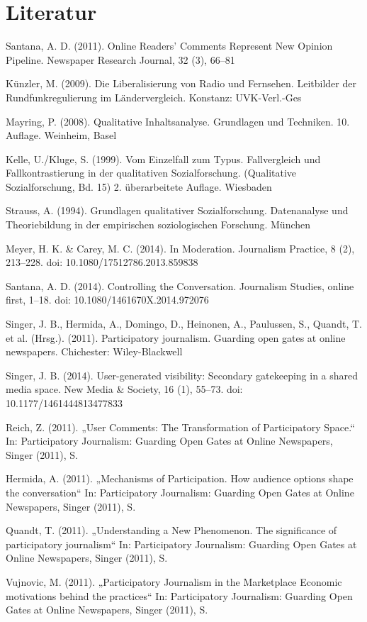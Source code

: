 \documentclass[12pt,titlepage=no,parskip=full]{scrartcl} %
\begin{document}
\section{Literatur}

Santana, A. D. (2011). Online Readers' Comments Represent New Opinion Pipeline. Newspaper Research Journal, 32 (3), 66–81

Künzler, M. (2009). Die Liberalisierung von Radio und Fernsehen. Leitbilder der Rundfunkregulierung im Ländervergleich. Konstanz: UVK-Verl.-Ges

Mayring, P. (2008). Qualitative Inhaltsanalyse. Grundlagen und Techniken. 10. Auflage. Weinheim, Basel

Kelle, U./Kluge, S. (1999). Vom Einzelfall zum Typus. Fallvergleich und Fallkontrastierung in der qualitativen Sozialforschung. 
(Qualitative Sozialforschung, Bd. 15) 2. überarbeitete Auflage. Wiesbaden

Strauss, A. (1994). Grundlagen qualitativer Sozialforschung. Datenanalyse und Theoriebildung in der empirischen
soziologischen Forschung. München

Meyer, H. K. \&  Carey, M. C. (2014). In Moderation. Journalism Practice, 8 (2), 213–228. doi: 10.1080/17512786.2013.859838

Santana, A. D. (2014). Controlling the Conversation. Journalism Studies, online first, 1–18. doi: 10.1080/1461670X.2014.972076

Singer, J. B., Hermida, A., Domingo, D., Heinonen, A., Paulussen, S., Quandt, T. et al. (Hrsg.). (2011). Participatory journalism. Guarding open gates at online newspapers. Chichester: Wiley-Blackwell

Singer, J. B. (2014). User-generated visibility: Secondary gatekeeping in a shared media space. New Media \& Society, 16 (1), 55–73. 
doi: 10.1177/1461444813477833

Reich, Z. (2011). „User Comments: The Transformation of Participatory Space.“ In: Participatory
Journalism: Guarding Open Gates at Online Newspapers, Singer (2011), S. 

Hermida, A. (2011). „Mechanisms of Participation. How audience options shape the conversation“ In: Participatory
Journalism: Guarding Open Gates at Online Newspapers, Singer (2011), S. 

Quandt, T. (2011).  „Understanding a New Phenomenon. The significance of participatory journalism“ In: Participatory
Journalism: Guarding Open Gates at Online Newspapers, Singer (2011), S. 

Vujnovic, M. (2011).  „Participatory Journalism in the Marketplace Economic motivations behind the practices“ In: Participatory
Journalism: Guarding Open Gates at Online Newspapers, Singer (2011), S. 
\end{document}
